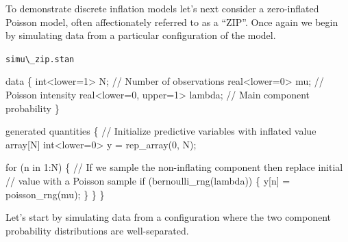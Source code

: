 \documentclass[
  letterpaper,
  DIV=11,
  numbers=noendperiod]{scrartcl}
\newenvironment{Shaded}{\begin{snugshade}}{\end{snugshade}}
\newcommand{\CommentTok}[1]{\textcolor[rgb]{0.37,0.37,0.37}{#1}}
\newcommand{\ControlFlowTok}[1]{\textcolor[rgb]{0.00,0.23,0.31}{#1}}
\newcommand{\DataTypeTok}[1]{\textcolor[rgb]{0.68,0.00,0.00}{#1}}
\newcommand{\DecValTok}[1]{\textcolor[rgb]{0.68,0.00,0.00}{#1}}
\newcommand{\KeywordTok}[1]{\textcolor[rgb]{0.00,0.23,0.31}{#1}}
\newcommand{\NormalTok}[1]{\textcolor[rgb]{0.00,0.23,0.31}{#1}}
\begin{document}
To demonstrate discrete inflation models let's next consider a
zero-inflated Poisson model, often affectionately referred to as a
``ZIP''. Once again we begin by simulating data from a particular
configuration of the model.

\begin{codelisting}

\caption{\texttt{simu\textbackslash\_zip.stan}}

\begin{Shaded}
\begin{Highlighting}[]
\KeywordTok{data}\NormalTok{ \{}
  \DataTypeTok{int}\NormalTok{\textless{}}\KeywordTok{lower}\NormalTok{=}\DecValTok{1}\NormalTok{\textgreater{} N;   }\CommentTok{// Number of observations}
  \DataTypeTok{real}\NormalTok{\textless{}}\KeywordTok{lower}\NormalTok{=}\DecValTok{0}\NormalTok{\textgreater{} mu; }\CommentTok{// Poisson intensity}
  \DataTypeTok{real}\NormalTok{\textless{}}\KeywordTok{lower}\NormalTok{=}\DecValTok{0}\NormalTok{, }\KeywordTok{upper}\NormalTok{=}\DecValTok{1}\NormalTok{\textgreater{} lambda; }\CommentTok{// Main component probability}
\NormalTok{\}}

\KeywordTok{generated quantities}\NormalTok{ \{}
  \CommentTok{// Initialize predictive variables with inflated value}
  \DataTypeTok{array}\NormalTok{[N] }\DataTypeTok{int}\NormalTok{\textless{}}\KeywordTok{lower}\NormalTok{=}\DecValTok{0}\NormalTok{\textgreater{} y = rep\_array(}\DecValTok{0}\NormalTok{, N);}

  \ControlFlowTok{for}\NormalTok{ (n }\ControlFlowTok{in} \DecValTok{1}\NormalTok{:N) \{}
    \CommentTok{// If we sample the non{-}inflating component then replace initial}
    \CommentTok{// value with a Poisson sample}
    \ControlFlowTok{if}\NormalTok{ (bernoulli\_rng(lambda)) \{}
\NormalTok{      y[n] = poisson\_rng(mu);}
\NormalTok{    \}}
\NormalTok{  \}}
\NormalTok{\}}
\end{Highlighting}
\end{Shaded}

\end{codelisting}

Let's start by simulating data from a configuration where the two
component probability distributions are well-separated.
\end{document}
